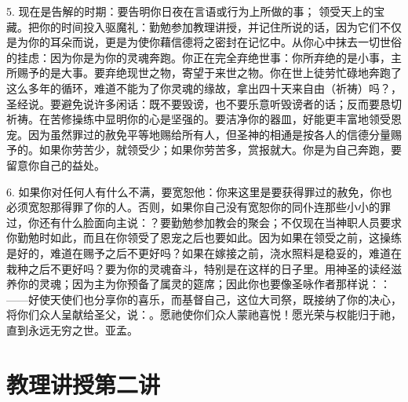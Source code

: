 5. 现在是告解的时期：要告明你日夜在言语或行为上所做的事； 领受天上的宝藏。把你的时间投入驱魔礼：勤勉参加教理讲授，并记住所说的话，因为它们不仅是为你的耳朵而说，更是为使你藉信德将之密封在记忆中。从你心中抹去一切世俗的挂虑：因为你是为你的灵魂奔跑。你正在完全弃绝世事：你所弃绝的是小事，主所赐予的是大事。要弃绝现世之物，寄望于来世之物。你在世上徒劳忙碌地奔跑了这么多年的循环，难道不能为了你灵魂的缘故，拿出四十天来自由（祈祷）吗？，圣经说。要避免说许多闲话：既不要毁谤，也不要乐意听毁谤者的话；反而要恳切祈祷。在苦修操练中显明你的心是坚强的。要洁净你的器皿，好能更丰富地领受恩宠。因为虽然罪过的赦免平等地赐给所有人，但圣神的相通是按各人的信德分量赐予的。如果你劳苦少，就领受少；如果你劳苦多，赏报就大。你是为自己奔跑，要留意你自己的益处。\par

6. 如果你对任何人有什么不满，要宽恕他：你来这里是要获得罪过的赦免，你也必须宽恕那得罪了你的人。否则，如果你自己没有宽恕你的同仆连那些小小的罪过，你还有什么脸面向主说：？要勤勉参加教会的聚会；不仅现在当神职人员要求你勤勉时如此，而且在你领受了恩宠之后也要如此。因为如果在领受之前，这操练是好的，难道在赐予之后不更好吗？如果在嫁接之前，浇水照料是稳妥的，难道在栽种之后不更好吗？要为你的灵魂奋斗，特别是在这样的日子里。用神圣的读经滋养你的灵魂；因为主为你预备了属灵的筵席；因此你也要像圣咏作者那样说：：——好使天使们也分享你的喜乐，而基督自己，这位大司祭，既接纳了你的决心，将你们众人呈献给圣父，说：。愿祂使你们众人蒙祂喜悦！愿光荣与权能归于祂，直到永远无穷之世。亚孟。\par



\section{教理讲授第二讲}

\par

\par

